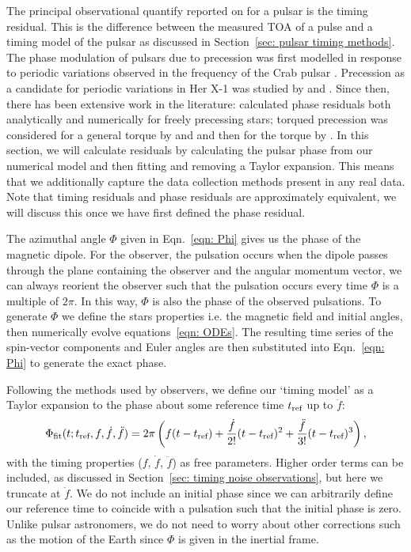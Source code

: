 \documentclass[../full_thesis/full_thesis.tex]{subfiles}
\begin{document}
The principal observational quantify reported on for a pulsar is the timing
residual. This is the difference between the measured TOA of a pulse and a
timing model of the pulsar as discussed in Section~\ref{sec: pulsar timing
methods}.  The phase modulation of pulsars due to precession was first modelled
in response to periodic variations observed in the frequency of the Crab pulsar
\citep{Ruderman1970, chiuderi1970shape}. Precession as a candidate for 
periodic variations in Her X-1 was
studied by \citet{bisnovatyi1990model} and \citet{bisnovatyi1993period}. Since
then, there has been extensive work in the literature: \citet{Nelson1990}
calculated phase residuals both analytically and numerically for freely
precessing stars; torqued precession was considered for a general torque by
\citet{Jones1988excitation} and \citet{Cordes1993} and then for the
\citet{Deutsch1955} torque by \citet{Melatos1999, Melatos2000}.  In this
section, we will calculate residuals by calculating the pulsar phase from our
numerical model and then fitting and removing a Taylor expansion. This means
that we additionally capture the data collection methods present in any real
data. Note that timing residuals and phase residuals are approximately
equivalent, we will discuss this once we have first defined the phase residual.

The azimuthal angle $\Phi$ given in Eqn.~\eqref{eqn: Phi} gives us the phase of
the magnetic dipole. For the observer, the pulsation occurs when the dipole
passes through the plane containing the observer and the angular momentum
vector,  we can always reorient the observer such that the pulsation occurs
every time $\Phi$ is a multiple of $2\pi$. In this way, $\Phi$ is also the
phase of the observed pulsations. To generate $\Phi$ we define the stars
properties i.e. the magnetic field and initial angles, then numerically
evolve equations~\eqref{eqn: ODEs}. The resulting time series of the spin-vector
components and Euler angles are then substituted into Eqn.~\eqref{eqn: Phi} to
generate the exact phase.

Following the methods used by observers, we define our `timing model' as
a Taylor expansion to the phase about some reference time $t_{\textrm{ref}}$ up to $\ddot{f}$:
\begin{equation}
    \Phi_{\mathrm{fit}}(t; t_{\textrm{ref}}, f, \dot{f}, \ddot{f}) =
    2\pi \left(f(t - t_{\textrm{ref}}) +
                          \frac{\dot{f}}{2!}(t-t_{\textrm{ref}})^{2} +
                          \frac{\ddot{f}}{3!}(t-t_{\textrm{ref}})^{3}
                          \right),
\label{eqn: TR taylor expansion}
\end{equation}
with the timing properties ($f$, $\dot{f}$, $\ddot{f}$) as free parameters.
Higher order terms can be included, as discussed in Section~\ref{sec: timing noise
observations}, but here we truncate at $\ddot{f}$. We do not include an initial
phase since we can arbitrarily define our reference time to coincide with a
pulsation such that the initial phase is zero.  Unlike pulsar astronomers, we
do not need to worry about other corrections such as the motion of the Earth
since $\Phi$ is given in the inertial frame.
\end{document}
